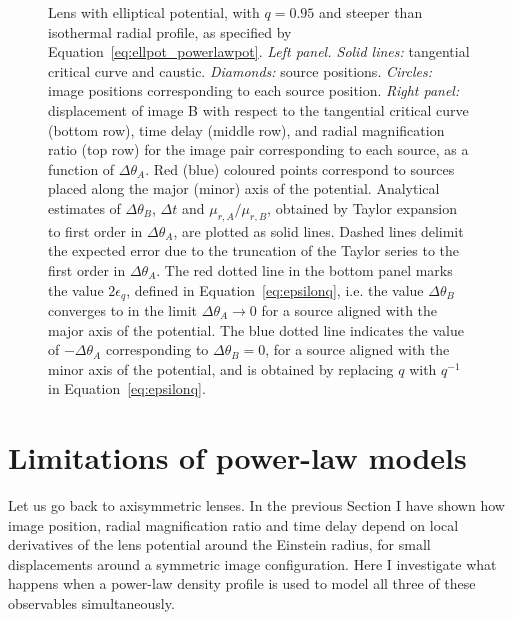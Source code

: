 \documentclass[usenatbib]{mnras}
\def\Eref#1{Equation~\ref{#1}\xspace}
\begin{document}
\begin{figure}
\begin{tabular}{cc}
 \end{tabular}
 \caption{Lens with elliptical potential, with $q=0.95$ and steeper than isothermal radial profile, as specified by \Eref{eq:ellpot_powerlawpot}. {\em Left panel. Solid lines:} tangential critical curve and caustic. {\em Diamonds:} source positions. {\em Circles:} image positions corresponding to each source position.
{\em Right panel:} displacement of image B with respect to the tangential critical curve (bottom row), time delay (middle row), and radial magnification ratio (top row) for the image pair corresponding to each source, as a function of $\Delta\theta_A$.
Red (blue) coloured points correspond to sources placed along the major (minor) axis of the potential. 
Analytical estimates of $\Delta\theta_B$, $\Delta t$ and $\mu_{r,A}/\mu_{r,B}$, obtained by Taylor expansion to first order in $\Delta\theta_A$, are plotted as solid lines. Dashed lines delimit the expected error due to the truncation of the Taylor series to the first order in $\Delta\theta_A$.
The red dotted line in the bottom panel marks the value $2\epsilon_q$, defined in \Eref{eq:epsilonq}, i.e. the value $\Delta\theta_B$ converges to in the limit $\Delta\theta_A\rightarrow0$ for a source aligned with the major axis of the potential. The blue dotted line indicates the value of $-\Delta\theta_A$ corresponding to $\Delta\theta_B=0$, for a source aligned with the minor axis of the potential, and is obtained by replacing $q$ with $q^{-1}$ in \Eref{eq:epsilonq}.
}
 \label{fig:ellpot}
\end{figure}
%

\section{Limitations of power-law models}\label{sect:pl}

Let us go back to axisymmetric lenses.
In the previous Section I have shown how image position, radial magnification ratio and time delay depend on local derivatives of the lens potential around the Einstein radius, for small displacements around a symmetric image configuration.
Here I investigate what happens when a power-law density profile is used to model all three of these observables simultaneously.
\end{document}
